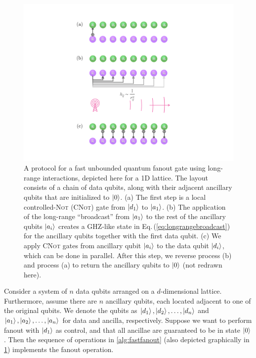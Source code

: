 \begin{figure}[t]
\centering
    \includegraphics[scale=0.45]{figures/fanoutgate.pdf}
\centering
  \caption{A protocol for a fast unbounded quantum fanout gate using long-range interactions, depicted here for a 1D lattice.
  The layout consists of a chain of data qubits, along with their adjacent ancillary qubits that are initialized to $\left | 0 \right\rangle$.
  (a) The first step is a local controlled-\textsc{Not} (\textsc{CNot}) gate from $\left | d_1 \right\rangle$ to $\left | a_1 \right\rangle$.
  (b) The application of the long-range ``broadcast'' from $\left | a_1 \right\rangle$ to the rest of the ancillary qubits $\left | a_i \right\rangle$ creates a GHZ-like state in Eq.\,(\ref{eq:longrangebroadcast}) for the ancillary qubits together with the first data qubit.
  (c) We apply \textsc{CNot} gates from ancillary qubit $\left | a_i \right\rangle$ to the data qubit $\left | d_i \right\rangle$, which can be done in parallel. After this step, we reverse process (b) and process (a) to return the ancillary qubits to $\left | 0 \right\rangle$ (not redrawn here). }
  \label{fig:broadcast}
\end{figure}

Consider a system of $n$ data qubits arranged on a $d$-dimensional lattice.
Furthermore, assume there are $n$ ancillary qubits, each located adjacent to one of the original qubits.
We denote the qubits as $\left | d_1 \right\rangle, \left | d_2 \right\rangle, \dots, \left | d_n \right\rangle$ and $\left | a_1 \right\rangle, \left | a_2 \right\rangle, \dots, \left | a_n \right\rangle$ for data and ancilla, respectively.
Suppose we want to perform fanout with $\left | d_1 \right\rangle$ as control, and that all ancillae are guaranteed to be in state $\left | 0 \right\rangle$.
Then the sequence of operations in \cref{alg:fastfanout} (also depicted graphically in \cref{fig:broadcast}) implements the fanout operation.

